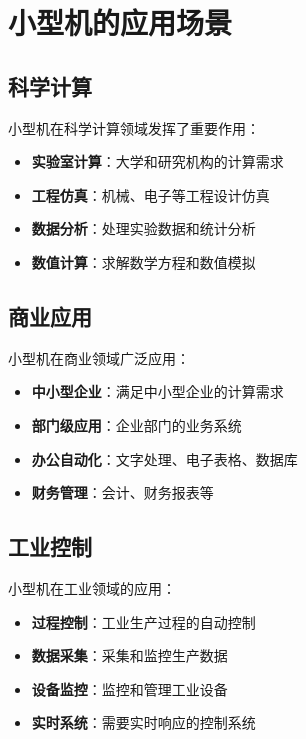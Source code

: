 \documentclass[12pt,UTF8]{ctexbook}
\begin{document}
\chapter{小型机的应用场景}
\label{chap:applications}

\section{科学计算}

小型机在科学计算领域发挥了重要作用：

\begin{itemize}[leftmargin=2cm]
    \item \textbf{实验室计算}：大学和研究机构的计算需求
    \item \textbf{工程仿真}：机械、电子等工程设计仿真
    \item \textbf{数据分析}：处理实验数据和统计分析
    \item \textbf{数值计算}：求解数学方程和数值模拟
\end{itemize}

\section{商业应用}

小型机在商业领域广泛应用：

\begin{itemize}[leftmargin=2cm]
    \item \textbf{中小型企业}：满足中小型企业的计算需求
    \item \textbf{部门级应用}：企业部门的业务系统
    \item \textbf{办公自动化}：文字处理、电子表格、数据库
    \item \textbf{财务管理}：会计、财务报表等
\end{itemize}

\section{工业控制}

小型机在工业领域的应用：

\begin{itemize}[leftmargin=2cm]
    \item \textbf{过程控制}：工业生产过程的自动控制
    \item \textbf{数据采集}：采集和监控生产数据
    \item \textbf{设备监控}：监控和管理工业设备
    \item \textbf{实时系统}：需要实时响应的控制系统
\end{itemize}
\end{document}
